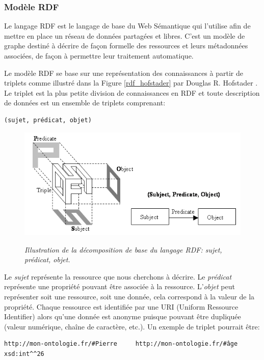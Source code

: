 \subsubsection{Modèle RDF} \label{rdf_model}

Le langage RDF est le langage de base du Web Sémantique qui l'utilise afin de mettre en place un réseau de données partagées et libres. C'est un modèle de graphe destiné à décrire de façon formelle des ressources et leurs métadonnées associées, de façon à permettre leur traitement automatique.

Le modèle RDF se base sur une représentation des connaissances à partir de triplets comme illustré dans la Figure \ref{rdf_hofstader} par Douglas R. Hofstader \cite{douglas1979godel}. Le triplet est la plus petite division de connaissances en RDF et toute description de données est un ensemble de triplets comprenant:

\begin{lstlisting}
(sujet, prédicat, objet)
\end{lstlisting}

\begin{figure}
  \centering
  {\includegraphics[width=.5\linewidth]{./figures/ch2/rdf_hofstader}}
    \caption{\it Illustration de la décomposition de base du langage RDF: sujet, prédicat, objet.}
  \label{Fig:rdf_hofstader}
  \hspace{0.3cm}
\end{figure}

Le \textit{sujet} représente la ressource que nous cherchons à décrire. Le \textit{prédicat} représente une propriété pouvant être associée à la ressource. L'\textit{objet} peut représenter soit une ressource, soit une donnée, cela correspond à la valeur de la propriété.
Chaque ressource est identifiée par une URI (Uniform Ressource Identifier) alors qu'une donnée est anonyme puisque pouvant être dupliquée (valeur numérique, chaîne de caractère, etc.). Un exemple de triplet pourrait être:

\begin{lstlisting}
http://mon-ontologie.fr/#Pierre 	http://mon-ontologie.fr/#âge	xsd:int^^26
\end{lstlisting}

